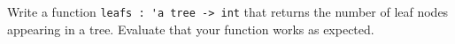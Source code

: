 Write a function \lstinline{leafs : 'a tree -> int} that returns the
number of leaf nodes appearing in a tree. Evaluate
that your function works as expected.
